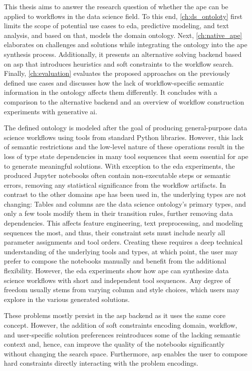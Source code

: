 This thesis aims to answer the research question of whether the \acf{ape} can be applied to workflows in the data science field. To this end, \autoref{ch:ds_ontoloty} first limits the scope of potential use cases to \ac{eda}, predictive modeling, and text analysis, and based on that, models the domain ontology. Next, \autoref{ch:native_ape} elaborates on challenges and solutions while integrating the ontology into the \ac{ape} synthesis process. Additionally, it presents an alternative solving backend based on \acf{asp} that introduces heuristics and soft constraints to the workflow search. Finally, \autoref{ch:evaluation} evaluates the proposed approaches on the previously defined use cases and discusses how the lack of workflow-specific semantic information in the ontology affects them differently. It concludes with a comparison to the alternative backend and an overview of workflow construction experiments with generative \ac{ai}.

The defined ontology is modeled after the goal of producing general-purpose data science workflows using tools from standard Python libraries. However, this lack of semantic restrictions and the low-level nature of these operations result in the loss of type state dependencies in many tool sequences that seem essential for \ac{ape} to generate meaningful solutions. With exception to the \ac{eda} experiments, the produced Jupyter notebooks often contain non-executable steps or semantic errors, removing any statistical significance from the workflow artifacts. In contrast to the other domains \ac{ape} has been used in, the underlying types are not changing: Tables and columns are the data science ontology's primary types, and only a few tools modify them in their transition rules, further removing data dependencies. This affects feature engineering, text preprocessing, and modeling sequences the most, and thus, their constraint sets must include nearly all parameter assignments and tool orders. Creating these requires a deep technical understanding of the underlying tools and types, at which point, the user may prefer to compose the notebooks manually and benefit from the additional flexibility. However, the \ac{eda} experiments show how \ac{ape} can synthesize data science workflows with short and independent tool sequences. Any degree of freedom usually stems from varying column and style choices, which users may explore in the various generated solutions.

These problems mostly persist in the \ac{asp} backend as it uses the same core concept. However, the addition of soft constraints encoding domain, workflow, and user-specific solution preferences reintroduces some of the lacking semantic context and, hence, can improve the quality of the notebooks significantly without changing the search space. Furthermore, \ac{asp} enables the user to compose hard constraints directly interacting with the problem encodings.

